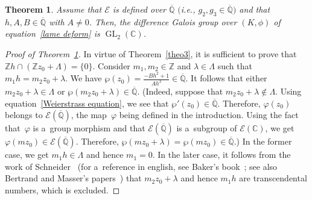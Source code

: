 \documentclass[10pt,a4paper]{amsart}
\numberwithin{equation}{section}
\newtheorem{Theorem}{Theorem}[section]
\begin{document}
\begin{Theorem}
\label{theo lame alg}
Assume that $\mathcal{E}$ is defined over $\overline{\mathbb{Q}}$ $($i.e., $g_{2},g_{3} \in \overline{\mathbb{Q}})$
and that $h,A,B\in \overline{\mathbb{Q}}$ with $A \neq 0$.
Then, the difference Galois group over $(K,\phi)$ of equation~\eqref{lame deform} is $\operatorname{GL}_{2}(\mathbb C)$.
\end{Theorem}

\begin{proof}[Proof of Theorem~\ref{theo lame alg}]
In virtue of Theorem~\ref{theo3}, it is suf\/f\/icient to prove that $\mathbb Z h
\cap (\mathbb Z z_{0} + \Lambda)=\{0\}$.
Consider $m_{1},m_{2}\in \mathbb Z$ and $\lambda \in \Lambda$ such that $m_{1}h=m_{2}z_{0}+\lambda$.
We have $\wp(z_{0})=\frac{-Bh^{2}+1}{A h^{2}} \in \overline{\mathbb{Q}}$.
It follows that either $m_{2}z_{0}+\lambda \in \Lambda$ or $\wp(m_{2}z_{0}+\lambda) \in \overline{\mathbb{Q}}$.
(Indeed, suppose that $m_{2}z_{0}+\lambda \not \in \Lambda$.
Using equation~\eqref{Weierstrass equation}, we see that $\wp'(z_{0}) \in \overline{\mathbb{Q}}$.
Therefore, $\varphi(z_{0})$ belongs to $ \mathcal{E}(\overline{\mathbb{Q}})$, the map~$\varphi$ being def\/ined in the
introduction.
Using the fact that~$\varphi$ is a~group morphism and that $\mathcal{E}(\overline{\mathbb{Q}})$ is a~subgroup of
$\mathcal{E}(\mathbb C)$, we get $\varphi(mz_{0}) \in \mathcal{E}(\overline{\mathbb{Q}})$.
Therefore, $\wp(mz_{0}+\lambda)=\wp(mz_{0}) \in \overline{\mathbb{Q}}$.) In the former case, we get $m_{1}h\in \Lambda$
and hence $m_{1}=0$.
In the later case, it follows from the work of Schneider~\cite{schneider} (for a~reference in english, see Baker's
book~\cite[Theorem 6.2]{BakerTNT}; see also Bertrand and Masser's papers~\cite{BerMas,Mas75}) that $m_{2}z_{0}+\lambda$
and hence $m_{1}h$ are transcendental numbers, which is excluded.
\end{proof}
\end{document}

